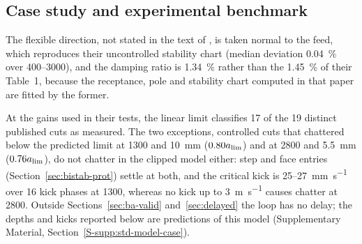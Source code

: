 \subsection{Case study and experimental benchmark}\label{sec:model-case}

The flexible direction, not stated in the text of \citet{ozsoy2026robust}, is taken normal to the feed, which reproduces their uncontrolled stability chart (median deviation \SI{0.04}{\percent} over \SIrange{400}{3000}{\rpm}), and the damping ratio is \SI{1.34}{\percent} rather than the \SI{1.45}{\percent} of their Table~1, because the receptance, pole and stability chart computed in that paper are fitted by the former.

At the gains used in their tests, the linear limit classifies 17 of the 19 distinct published cuts as measured. The two exceptions, controlled cuts that chattered below the predicted limit at \SI{1300}{\rpm} and \SI{10}{\milli\metre} ($0.80a_{\lim}$) and at \SI{2800}{\rpm} and \SI{5.5}{\milli\metre} ($0.76a_{\lim}$), do not chatter in the clipped model either: step and face entries (Section~\ref{sec:bistab-prot}) settle at both, and the critical kick is 25--\SI{27}{\milli\metre\per\second} over 16 kick phases at \SI{1300}{\rpm}, whereas no kick up to \SI{3}{\metre\per\second} causes chatter at \SI{2800}{\rpm}. Outside Sections~\ref{sec:ba-valid} and~\ref{sec:delayed} the loop has no delay; the depths and kicks reported below are predictions of this model (Supplementary Material, Section~\ref{S-supp:std-model-case}).

